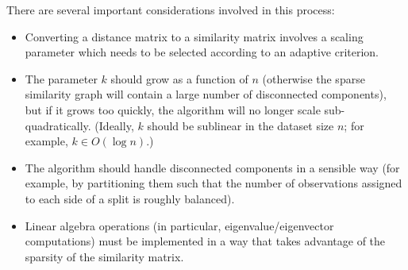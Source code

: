 \documentclass[11pt]{article}
\begin{document}
There are several important considerations involved in this process:
\begin{itemize}
    \item Converting a distance matrix to a similarity matrix involves a scaling parameter which needs to be selected according to an adaptive criterion.
    \item The parameter $k$ should grow as a function of $n$ (otherwise the sparse similarity graph will contain a large number of disconnected components), but if it grows too quickly, the algorithm will no longer scale sub-quadratically.  (Ideally, $k$ should be sublinear in the dataset size $n$; for example, $k \in O(\log n)$.)
    \item The algorithm should handle disconnected components in a sensible way (for example, by partitioning them such that the number of observations assigned to each side of a split is roughly balanced).
    \item Linear algebra operations (in particular, eigenvalue/eigenvector computations) must be implemented in a way that takes advantage of the sparsity of the similarity matrix.
\end{itemize}
\end{document}
